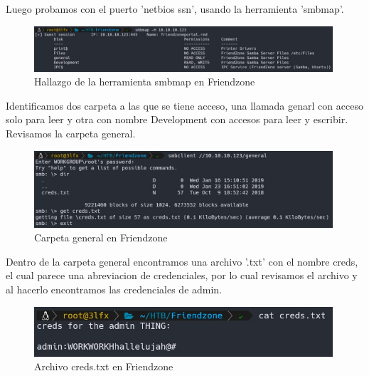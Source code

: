         \large{Luego probamos con el puerto 'netbios ssn', usando la herramienta 'smbmap'.}
        \par
        \begin{figure}[H]
            \centering
            \includegraphics[width=0.99\textwidth]{informe4/imagenes/friendzone/03_smbmap.png}
            \caption{Hallazgo de la herramienta smbmap en Friendzone} 
        \end{figure}

        \large{Identificamos dos carpeta a las que se tiene acceso, una llamada genarl con acceso solo para leer y otra con nombre Development con accesos para leer y escribir. Revisamos la carpeta general.}
        \par
        \begin{figure}[H]
            \centering
            \includegraphics[width=0.99\textwidth]{informe4/imagenes/friendzone/04_smb_creds.png}
            \caption{Carpeta general en Friendzone} 
        \end{figure}

        \large{Dentro de la carpeta general encontramos una archivo '.txt' con el nombre creds, el cual parece una abreviacion de credenciales, por lo cual revisamos el archivo y al hacerlo encontramos las credenciales de admin.}
        \par
        \begin{figure}[H]
            \centering
            \includegraphics[width=0.99\textwidth]{informe4/imagenes/friendzone/05_cred_friendzone.png}
            \caption{Archivo creds.txt en Friendzone} 
        \end{figure}

